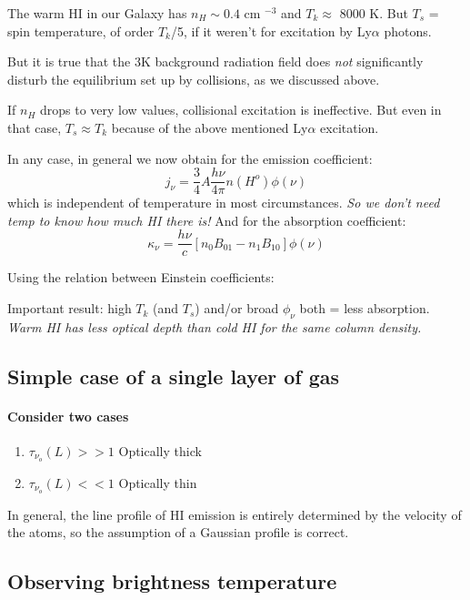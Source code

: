 \documentclass[11pt]{article}
\newcommand{\mar}[1]{\hspace{0pt}\marginpar{-\textcolor{black}{#1}-}}
\newcommand{\mynotes}[1]{{\fontfamily{cmss}\selectfont \textit{#1}}}
\begin{document}
The warm HI in our Galaxy has $n_{H}\sim0.4$ cm $^{-3}$ and $T_{k} \approx$ 8000 K.
But $T_{s}$ = spin temperature, of order $T_{k}$/5, if it weren't for
excitation by Ly$\alpha$ photons.

But it is true that the 3K background radiation field does \emph{not}
significantly disturb the equilibrium set up by collisions, as we
discussed above.

If $n_{H}$ drops to very low values, collisional excitation is ineffective.
But even in that case, $T_{s} \approx T_{k}$ because of the above mentioned
Ly$\alpha$ excitation.

In any case, in general we now obtain for the emission coefficient:
\[
    j_{\nu} = \frac{3}{4} A \frac{h\nu}{4\pi} n(H^{o}) \phi(\nu)
    \]
which is independent of temperature in most circumstances.
\mynotes{So we don't need temp to know how much HI there is!}
And for the absorption coefficient:
\[
    \kappa_{\nu} = \frac{h\nu}{c} \left[
        n_{0}B_{01} - n_{1}B_{10} \right]
        \phi(\nu)
    \]

\mar{38}
Using the relation between Einstein coefficients:

\textcolor{bred}{Important result:} high $T_{k}$ (and $T_{s}$) and/or
broad $\phi_{\nu}$ both = less absorption. \mynotes{Warm HI has less optical
depth than cold HI for the same column density.}

\subsection{Simple case of a single layer of gas}

\mar{39}
\paragraph{Consider two cases}
\begin{enumerate}[label={(\roman*)}]
    \item $\tau_{\nu_{o}}(L) >> 1$ Optically thick
    \item $\tau_{\nu_{o}}(L) << 1$ Optically thin
\end{enumerate}
In general, the line profile of HI emission is entirely determined by the velocity
of the atoms, so the assumption of a Gaussian profile is correct.

\mar{40}
\subsection{Observing brightness temperature}
\end{document}
